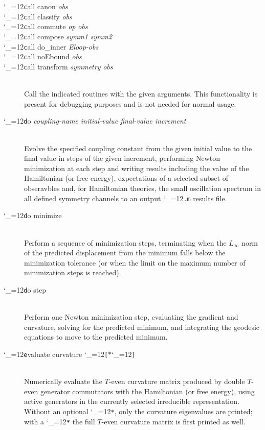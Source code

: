 \documentclass [12pt]{article}
\makeatletter
\renewcommand{\tt}{\begingroup\catcode`_=12\def\_{\string_}\tt@}
\newcommand{\tt@}[1]{\texttt{#1}\endgroup}
\makeatother
\begin{document}
\begin{description}
\item [\tt call canon {\it obs}] \bgroup \itemsep 0pt \parskip 0pt
\item [\tt call classify {\it obs}]
\item [\tt call commute {\it op} {\it obs}]
\item [\tt call compose {\it symm1} {\it symm2}]
\item [\tt call do\_inner {\it Eloop-obs}]
\item [\tt call noEbound {\it obs}]
\item [\tt call transform {\it symmetry} {\it obs}]~\\
    Call the indicated routines with the given arguments.
    This functionality is present for debugging purposes
    and is not needed for normal usage.
\egroup

\item [\tt do {\it coupling-name initial-value final-value increment}]~\\
    Evolve the specified coupling constant
    from the given initial value to the final value in steps of the
    given increment, performing Newton minimization at each step
    and writing results including the value of the Hamiltonian (or free energy),
    expectations of a selected subset of obseravbles and,
    for Hamiltonian theories, the small oscillation spectrum in all defined
    symmetry channels to an output \tt{.m} results file.

\item [\tt do minimize]~\\
    Perform a sequence of minimization steps,
    terminating when the $L_\infty$ norm of the predicted displacement from
    the minimum falls below the minimization tolerance (or when the
    limit on the maximum number of minimization steps is reached).

\item [\tt do step]~\\
    Perform one Newton minimization step,
    evaluating the gradient and curvature, solving for the
    predicted minimum, and integrating the geodesic equations
    to move to the predicted minimum.

\item [\tt evaluate curvature \tt{[}$*$\tt{]}]~\\
    Numerically evaluate the $T$-even curvature matrix
    produced by double $T$-even generator commutators
    with the Hamiltonian (or free energy),
    using active generators in the currently selected irreducible representation.
    Without an optional \tt{*}, only the curvature eigenvalues are printed;
    with a \tt{*} the full $T$-even curvature matrix is first printed as well.


\end{description}
\end{document}
